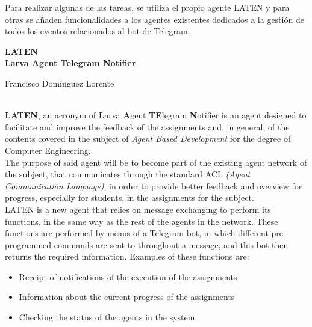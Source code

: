 	Para realizar algunas de las tareas, se utiliza el propio agente LATEN y para otras se añaden funcionalidades a los agentes existentes dedicados a la gestión de todos los eventos
	relacionados al bot de Telegram.\\

\cleardoublepage

\begin{center}
	{\large\bfseries LATEN \\ Larva Agent Telegram Notifier }\\
\end{center}
\begin{center}
	Francisco Domínguez Lorente\\
\end{center}
\vspace{0.5cm}
\vspace{0.7cm}

\\
    \textbf{LATEN}, an acronym of \textbf{L}arva \textbf{A}gent \textbf{TE}legram \textbf{N}otifier is an agent designed to facilitate and improve the feedback of the assignments and, in general, of the contents covered in the subject of \textit{Agent Based Development} for the degree of Computer Engineering.\\
    
    The purpose of said agent will be to become part of the existing agent network of the subject, that communicates through the standard ACL \textit{(Agent Communication Language)}, in order to provide better feedback and overview for progress, especially for students, in the assignments for the subject.\\
    
    LATEN is a new agent that relies on message exchanging to perform its functions, in the same way as the rest of the agents in the network. These functions are performed by means of a Telegram bot, in which different pre-programmed commands are sent to throughout a message, and this bot then returns the required information. Examples of these functions are:
    
    \begin{itemize}
		\item Receipt of notifications of the execution of the assignments
		\item Information about the current progress of the assignments
		\item Checking the status of the agents in the system
	\end{itemize}
	

